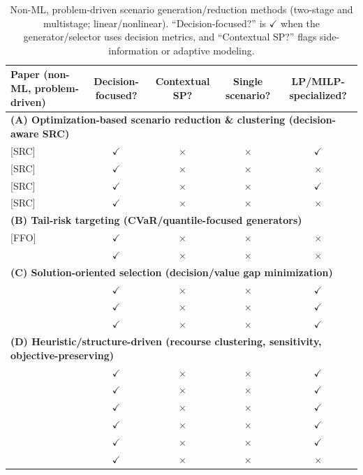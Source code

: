 \documentclass[11pt]{article}
\newcommand{\cmark}{\checkmark}
\newcommand{\xmark}{\times}
\begin{document}
\begin{table}[H]
\centering
\small
\setlength{\tabcolsep}{4pt}
\renewcommand{\arraystretch}{1.2}
\begin{tabular}{p{8.6cm}cccc}
\toprule
\textbf{Paper (non-ML, problem-driven)} & \textbf{Decision-focused?} & \textbf{Contextual SP?} & \textbf{Single scenario?} & \textbf{LP/MILP-specialized?} \\
\midrule
\multicolumn{5}{l}{\textbf{(A) Optimization-based scenario reduction \& clustering (decision-aware SRC)}}\\
\citet{henrion2022problem} [SRC] & $\cmark$ & $\xmark$ & $\xmark$ & $\cmark$ \\
\citet{bertsimas2023optred} [SRC] & $\cmark$ & $\xmark$ & $\xmark$ & $\xmark$ \\
\citet{keutchayan2023clustering} [SRC] & $\cmark$ & $\xmark$ & $\xmark$ & $\cmark$ \\
\citet{zhang2023optimized} [SRC] & $\cmark$ & $\xmark$ & $\xmark$ & $\xmark$ \\
\midrule
\multicolumn{5}{l}{\textbf{(B) Tail-risk targeting (CVaR/quantile-focused generators)}}\\
\citet{fairbrother2019problemdriven} [FFO] & $\cmark$ & $\xmark$ & $\xmark$ & $\xmark$ \\
\citet{arpon2018cvar} & $\cmark$ & $\xmark$ & $\xmark$ & $\xmark$ \\
\midrule
\multicolumn{5}{l}{\textbf{(C) Solution-oriented selection (decision/value gap minimization)}}\\
\citet{prochazka2020loss} & $\cmark$ & $\xmark$ & $\xmark$ & $\cmark$ \\
\citet{narum2020atfm} & $\cmark$ & $\xmark$ & $\xmark$ & $\cmark$ \\
\citet{narum2024unified} & $\cmark$ & $\xmark$ & $\xmark$ & $\cmark$ \\
\midrule
\multicolumn{5}{l}{\textbf{(D) Heuristic/structure-driven (recourse clustering, sensitivity, objective-preserving)}}\\
\citet{feng2013fsrc} & $\cmark$ & $\xmark$ & $\xmark$ & $\cmark$ \\
\citet{zhao2014layout} & $\cmark$ & $\xmark$ & $\xmark$ & $\cmark$ \\
\citet{guo2019correlatedvrp} & $\cmark$ & $\xmark$ & $\xmark$ & $\cmark$ \\
\citet{sun2018tep} & $\cmark$ & $\xmark$ & $\xmark$ & $\cmark$ \\
\citet{hewitt2022opcost} & $\cmark$ & $\xmark$ & $\xmark$ & $\cmark$ \\
\citet{rios2015limiteddata} & $\cmark$ & $\xmark$ & $\xmark$ & $\xmark$ \\
\bottomrule
\end{tabular}
\caption{Non-ML, problem-driven scenario generation/reduction methods (two-stage and multistage; linear/nonlinear). ``Decision-focused?'' is $\cmark$ when the generator/selector uses decision metrics, and ``Contextual SP?'' flags side-information or adaptive modeling.}
\end{table}



\end{document}

